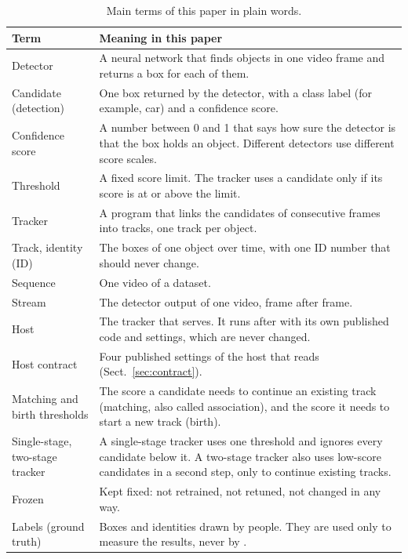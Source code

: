 \begin{table}[t]
\caption{Main terms of this paper in plain words.}
\label{tab:terms}
\centering\footnotesize
\setlength{\tabcolsep}{4pt}
\renewcommand{\arraystretch}{1.15}
\begin{tabular}{@{}>{\raggedright\arraybackslash}p{32mm}>{\raggedright\arraybackslash}p{123mm}@{}}
\toprule
Term & Meaning in this paper\\
\midrule
Detector & A neural network that finds objects in one video frame and returns a box for each of them.\\
Candidate (detection) & One box returned by the detector, with a class label (for example, car) and a confidence score.\\
Confidence score & A number between 0 and 1 that says how sure the detector is that the box holds an object. Different detectors use different score scales.\\
Threshold & A fixed score limit. The tracker uses a candidate only if its score is at or above the limit.\\
Tracker & A program that links the candidates of consecutive frames into tracks, one track per object.\\
Track, identity (ID) & The boxes of one object over time, with one ID number that should never change.\\
Sequence & One video of a dataset.\\
Stream & The detector output of one video, frame after frame.\\
Host & The tracker that \scl{} serves. It runs after \scl{} with its own published code and settings, which are never changed.\\
Host contract & Four published settings of the host that \scl{} reads (Sect.~\ref{sec:contract}).\\
Matching and birth thresholds & The score a candidate needs to continue an existing track (matching, also called association), and the score it needs to start a new track (birth).\\
Single-stage, two-stage tracker & A single-stage tracker uses one threshold and ignores every candidate below it. A two-stage tracker also uses low-score candidates in a second step, only to continue existing tracks.\\
Frozen & Kept fixed: not retrained, not retuned, not changed in any way.\\
Labels (ground truth) & Boxes and identities drawn by people. They are used only to measure the results, never by \scl{}.\\

\end{tabular}
\end{table}
